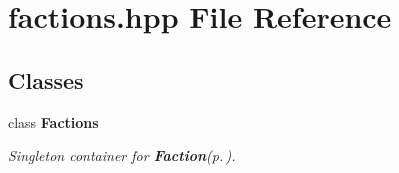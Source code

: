 \section{factions.hpp File Reference}
\label{factions_8hpp}
\subsection*{Classes}
\begin{CompactItemize}
\item 
class {\bf Factions}
\begin{CompactList}\small\item\em Singleton container for {\bf Faction}{\rm (p.\,\pageref{classFaction})}. \item\end{CompactList}\end{CompactItemize}
